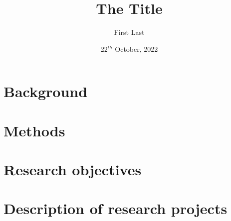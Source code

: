 \documentclass[10pt,b5paper,twoside,openany]{memoir}
\title{The Title}
\author{First Last}
\date{22$^{th}$ October, 2022}
\begin{document}
\setcounter{page}{0}


\frontmatter






\renewcommand*\contentsname{Table of contents}
\tableofcontents*






\clearpage




\mainmatter
\setcounter{page}{1}

\setcounter{secnumdepth}{3}
\newpage






\pagestyle{dtu}

\cleardoublepage
\begingroup

\chapter{Background}

\endgroup

\begingroup
\chapter{Methods}

\endgroup

\begingroup
\chapter{Research objectives}


\chapter{Description of research projects}

\endgroup
\end{document}
